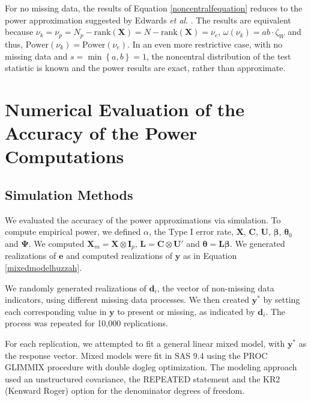 \documentclass[11pt]{article}
\begin{document}
For no missing data, the results of Equation \ref{noncentralfequation} reduces to the power approximation suggested by Edwards \textit{et al}. \cite{edwards_r2_2008}. The results are equivalent because $\nu_{k}=\nu_{p}=N_{p}-\text{rank}\left(\boldsymbol{X}\right)=N-\text{rank}\left(\boldsymbol{X}\right)=\nu_{e}$, $\omega\left(\nu_{k}\right)=ab\cdot\zeta_{W}$ and thus, $\text{Power}\left(\nu_{k}\right)=\text{Power}\left(\nu_{e}\right)$. In an even more restrictive case, with no missing data and $s=\min\left\{a,b\right\}=1$, the noncentral distribution of the test statistic is known and the power results are exact, rather than approximate.

\section{Numerical Evaluation of the Accuracy of the Power Computations}
\label{simulations}

\subsection{Simulation Methods}

We evaluated the accuracy of the power approximations via simulation. To compute empirical power, we defined $\alpha$, the Type I error rate, $\boldsymbol{X}$, $\boldsymbol{C}$, $\boldsymbol{U}$, $\boldsymbol{\beta}$, $\boldsymbol{\theta}_{0}$ and $\boldsymbol{\Psi}$. We computed $\boldsymbol{X}_{m}=\boldsymbol{X}\otimes\boldsymbol{I}_{p}$, $\boldsymbol{L}=\boldsymbol{C}\otimes\boldsymbol{U}'$ and $\boldsymbol{\theta}=\boldsymbol{L\beta}$. We generated realizations of $\boldsymbol{e}$ and computed realizations of $\boldsymbol{y}$ as in Equation \ref{mixedmodelhuzzah}.

We randomly generated realizations of $\boldsymbol{d}_{i}$, the vector of non-missing data indicators, using different missing data processes. We then created $\boldsymbol{y}^{\ast}$ by setting each corresponding value in $\boldsymbol{y}$ to present or missing, as indicated by $\boldsymbol{d}_{i}$. The process was repeated for 10,000 replications.

For each replication, we attempted to fit a general linear mixed model, with $\boldsymbol{y}^{\ast}$ as the response vector. Mixed models were fit in SAS 9.4 \cite{noauthor_sas_nodate} using the PROC GLIMMIX procedure with double dogleg optimization. The modeling approach used an unstructured covariance, the REPEATED statement and the KR2 (Kenward Roger) option for the denominator degrees of freedom. 
\end{document}

